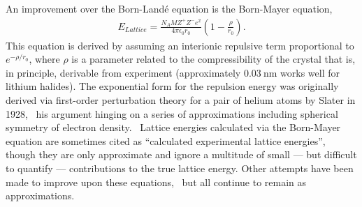 \documentclass[titlepage,11pt]{article}
\begin{document}
An improvement over the Born-Land\'{e} equation is the Born-Mayer equation,~\cite{Born1932,Huggins1937,Huggins1947}
\begin{align}
E_{Lattice} =  \frac { N _ { A } M Z ^ { + } Z ^ { - } e ^ { 2 } } { 4 \pi \epsilon _ { 0 } r _ { 0 } } \left( 1 - \frac { \rho } { r _ { 0 } } \right).
\label{eq:BornMayer}
\end{align}
This equation is derived by assuming an interionic repulsive term proportional to $e^{-\rho/r_{0}}$, where $\rho$ is a parameter related to the compressibility of the crystal that is, in principle, derivable from experiment (approximately $\SI{0.03}{\nano\meter}$ works well for lithium halides). The exponential form for the repulsion energy was originally derived via first-order perturbation theory for a pair of helium atoms by Slater in 1928,~\cite{Slater1928} his argument hinging on a series of approximations including spherical symmetry of electron density.~\cite{Buckingham1938} Lattice energies calculated via the Born-Mayer equation are sometimes cited as ``calculated experimental lattice energies'',~\cite{book:CRC} though they are only approximate and ignore a multitude of small --- but difficult to quantify --- contributions to the true lattice energy. Other attempts have been made to improve upon these equations,~\cite{Ladd1959} but all continue to remain as approximations.
\end{document}
